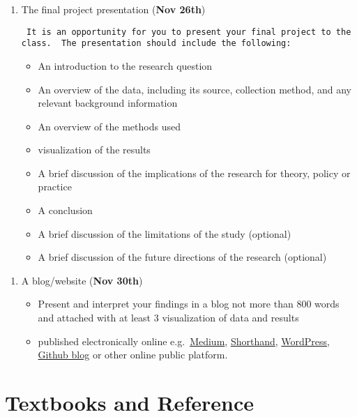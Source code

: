 \documentclass[
  letterpaper,
  DIV=11,
  numbers=noendperiod]{scrartcl}
\providecommand{\tightlist}{%
  \setlength{\itemsep}{0pt}\setlength{\parskip}{0pt}}
\begin{document}
\begin{enumerate}
\def\labelenumi{\arabic{enumi}.}
\setcounter{enumi}{1}
\item
  The final project presentation (\textbf{Nov 26th})

\begin{verbatim}
 It is an opportunity for you to present your final project to the class.  The presentation should include the following:
\end{verbatim}

  \begin{itemize}
  \tightlist
  \item
    An introduction to the research question
  \item
    An overview of the data, including its source, collection method,
    and any relevant background information
  \item
    An overview of the methods used
  \item
    visualization of the results
  \item
    A brief discussion of the implications of the research for theory,
    policy or practice
  \item
    A conclusion
  \item
    A brief discussion of the limitations of the study (optional)
  \item
    A brief discussion of the future directions of the research
    (optional)
  \end{itemize}
\end{enumerate}

\begin{enumerate}
\def\labelenumi{\arabic{enumi}.}
\setcounter{enumi}{2}
\item
  A blog/website (\textbf{Nov 30th})

  \begin{itemize}
  \item
    Present and interpret your findings in a blog not more than 800
    words and attached with at least 3 visualization of data and results
  \item
    published electronically online
    e.g.~\href{https://medium.com/}{Medium},
    \href{https://shorthand.com/}{Shorthand},
    \href{https://wordpress.com/}{WordPress},
    \href{https://github.blog/}{Github blog} or other online public
    platform.
  \end{itemize}
\end{enumerate}

\section{Textbooks and Reference}\label{textbooks-and-reference}
\end{document}
